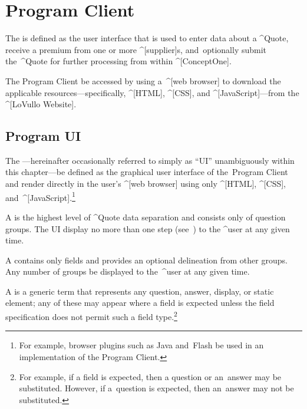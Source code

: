 
\chapter{Program Client}
\label{s:programui}


The  is defined as the user interface that is used to
enter data about a ^Quote, receive a premium from one or more
^[supplier]s, and~optionally submit the~^Quote for further processing from
within ^[ConceptOne].

The Program Client \shall be accessed by using a~^[web browser] to
download the applicable resources---specifically, ^[HTML], ^[CSS], and
^[JavaScript]---from the ^[LoVullo Website].

\incomplete
{}


\section{Program UI}\label{s:program-ui}

  The ---hereinafter occasionally referred to simply as
  ``UI'' unambiguously within this chapter---\shall be defined as the
  graphical user interface of the~Program Client and \shall render
  directly in the user's ^[web browser] using only ^[HTML], ^[CSS],
  and~^[JavaScript].\footnote{For example, browser plugins such as Java
  and~Flash \shallnot be used in an implementation of the Program Client.}

  A  is the highest level of ^Quote data
  separation and consists only of question groups. The UI \shall display
  no more than one step (see~) to the ^user at any
  given time.

  \incomplete
  A  contains only fields and provides an
  optional delineation from other groups. Any number of groups \may be
  displayed to the~^user at any given time.

  A  is a generic term that represents any
  question, answer, display, or static element; any of these may appear
  where a field is expected unless the field specification does not permit
  such a field type.\footnote{For example, if a field is expected, then a
    question or an~answer may be substituted.  However, if a~question is
  expected, then an~answer may not be substituted.}

